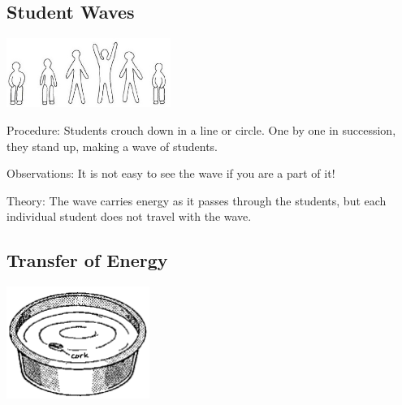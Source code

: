 \begin{multicols}{2}
\subsection{Student Waves}

\begin{center}
\includegraphics[width=0.4\textwidth]{./img/vso/student-waves.jpg}
\end{center}

\begin{description*}
\item[Procedure:]{Students crouch down in a line or circle. One by one in succession, they stand up, making a wave of students.}
\item[Observations:]{It is not easy to see the wave if you are a part of it!}
\item[Theory:]{The wave carries energy as it passes through the students, but each individual student does not travel with the wave.}
\end{description*}

\subsection{Transfer of Energy}

\begin{center}
\includegraphics[width=0.35\textwidth]{./img/source/trans-energy.png}
\end{center}


\end{multicols}
